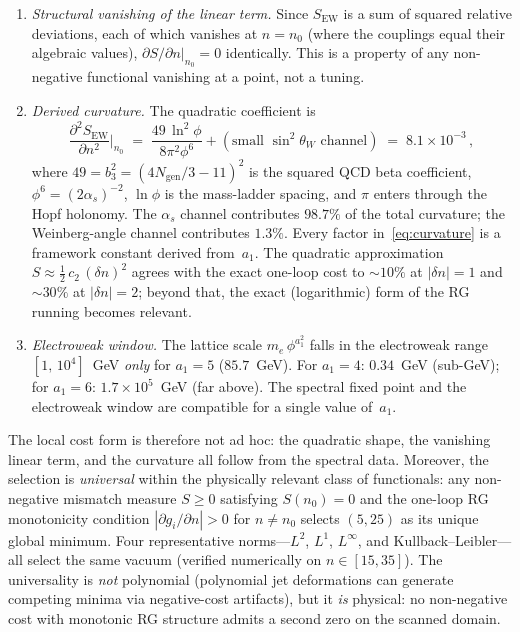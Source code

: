 \documentclass[12pt,a4paper]{article}
\theoremstyle{definition}
\begin{document}
\begin{enumerate}
\item[(iv)] \emph{Structural vanishing of the linear term.}  Since $S_{\mathrm{EW}}$ is a sum of squared relative deviations, each of which vanishes at $n = n_0$ (where the couplings equal their algebraic values), $\partial S/\partial n|_{n_0} = 0$ identically.  This is a property of any non-negative functional vanishing at a point, not a tuning.

\item[(v)] \emph{Derived curvature.}  The quadratic coefficient is
\begin{equation}
\frac{\partial^2 S_{\mathrm{EW}}}{\partial n^2}\bigg|_{n_0} \;=\; \frac{49\,\ln^2\phi}{8\pi^2\phi^6} + (\text{small }\sin^2\theta_W\text{ channel})\;=\; 8.1 \times 10^{-3}\,,
\label{eq:curvature}
\end{equation}
where $49 = b_3^2 = (4N_{\text{gen}}/3 - 11)^2$ is the squared QCD beta coefficient, $\phi^6 = (2\alpha_s)^{-2}$, $\ln\phi$ is the mass-ladder spacing, and $\pi$ enters through the Hopf holonomy.  The $\alpha_s$ channel contributes $98.7\%$ of the total curvature; the Weinberg-angle channel contributes $1.3\%$.  Every factor in~\eqref{eq:curvature} is a framework constant derived from~$a_1$.  The quadratic approximation $S \approx \tfrac{1}{2}\,c_2\,(\delta n)^2$ agrees with the exact one-loop cost to $\sim\!10\%$ at $|\delta n| = 1$ and $\sim\!30\%$ at $|\delta n| = 2$; beyond that, the exact (logarithmic) form of the RG running becomes relevant.

\item[(vi)] \emph{Electroweak window.}  The lattice scale $m_e\,\phi^{a_1^2}$ falls in the electroweak range $[1,\,10^4]$~GeV \emph{only} for $a_1 = 5$ ($85.7$~GeV).  For $a_1 = 4$: $0.34$~GeV (sub-GeV); for $a_1 = 6$: $1.7 \times 10^5$~GeV (far above).  The spectral fixed point and the electroweak window are compatible for a single value of~$a_1$.
\end{enumerate}

The local cost form is therefore not ad hoc: the quadratic shape, the vanishing linear term, and the curvature all follow from the spectral data.  Moreover, the selection is \emph{universal} within the physically relevant class of functionals: any non-negative mismatch measure $S \geq 0$ satisfying $S(n_0) = 0$ and the one-loop RG monotonicity condition $|\partial g_i / \partial n| > 0$ for $n \neq n_0$ selects $(5, 25)$ as its unique global minimum.  Four representative norms---$L^2$, $L^1$, $L^\infty$, and Kullback--Leibler---all select the same vacuum (verified numerically on $n \in [15, 35]$).  The universality is \emph{not} polynomial (polynomial jet deformations can generate competing minima via negative-cost artifacts), but it \emph{is} physical: no non-negative cost with monotonic RG structure admits a second zero on the scanned domain.
\end{document}
